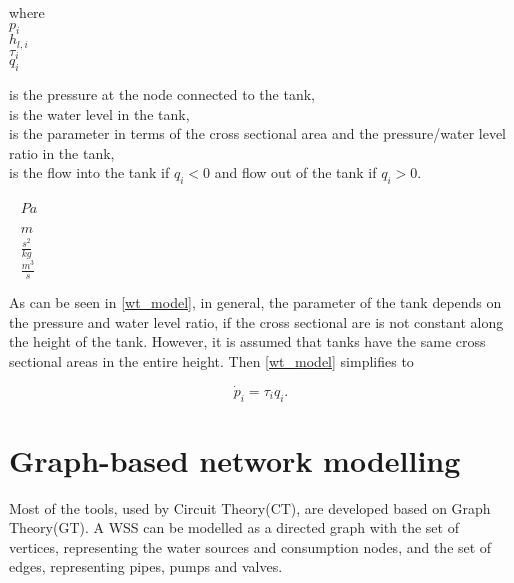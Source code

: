  \begin{minipage}[t]{0.20\textwidth}
where\\
\hspace*{8mm} $p_i$ \\
\hspace*{8mm} $h_{l,i}$ \\
\hspace*{8mm} $\tau_i$ \\
\newline
\hspace*{8mm} $q_i$ 
\end{minipage}
\begin{minipage}[t]{0.68\textwidth}
\vspace*{2mm}
is the pressure at the node connected to the tank,\\ 
is the water level in the tank,\\ 
is the parameter in terms of the cross sectional area and the pressure/water level ratio in the tank,\\
is the flow into the tank if $q_i < 0$ and flow out of the tank if $q_i > 0$.
\end{minipage}
\begin{minipage}[t]{0.10\textwidth}
\vspace*{2mm}
\textcolor{White}{te}$\unit{Pa}$\\
\textcolor{White}{te}$\unit{m}$\\
\textcolor{White}{te}$\unit{\frac{s^2}{kg}}$\\
\textcolor{White}{te}$\unit{\frac{m^3}{s}}$
\end{minipage} 

As can be seen in \eqref{wt_model}, in general, the parameter of the tank depends on the pressure and water level ratio, if the cross sectional are is not constant along the height of the tank. However, it is assumed that tanks have the same cross sectional areas in the entire height. Then \eqref{wt_model} simplifies to

\begin{equation}
\label{wt_model}
\dot{p}_i = \tau_i q_i.
\end{equation}

\section{Graph-based network modelling}
\label{graph_based_network_modelling}

Most of the tools, used by Circuit Theory(CT), are developed based on Graph Theory(GT). A WSS can be modelled as a directed graph with the set of vertices, representing the water sources and consumption nodes, and the set of edges, representing pipes, pumps and valves. 

